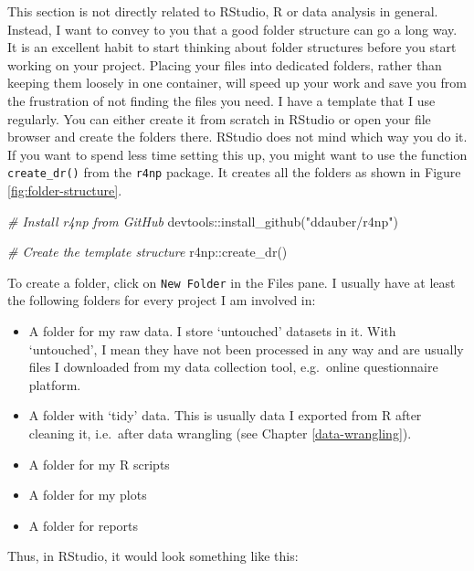 \documentclass[
]{book}
\newenvironment{Shaded}{\begin{snugshade}}{\end{snugshade}}
\newcommand{\CommentTok}[1]{\textcolor[rgb]{0.56,0.35,0.01}{\textit{#1}}}
\newcommand{\FunctionTok}[1]{\textcolor[rgb]{0.00,0.00,0.00}{#1}}
\newcommand{\NormalTok}[1]{#1}
\newcommand{\SpecialCharTok}[1]{\textcolor[rgb]{0.00,0.00,0.00}{#1}}
\newcommand{\StringTok}[1]{\textcolor[rgb]{0.31,0.60,0.02}{#1}}
\begin{document}
This section is not directly related to RStudio, R or data analysis in general. Instead, I want to convey to you that a good folder structure can go a long way. It is an excellent habit to start thinking about folder structures before you start working on your project. Placing your files into dedicated folders, rather than keeping them loosely in one container, will speed up your work and save you from the frustration of not finding the files you need. I have a template that I use regularly. You can either create it from scratch in RStudio or open your file browser and create the folders there. RStudio does not mind which way you do it. If you want to spend less time setting this up, you might want to use the function \texttt{create\_dr()} from the \texttt{r4np} package. It creates all the folders as shown in Figure \ref{fig:folder-structure}.

\begin{Shaded}
\begin{Highlighting}[]
\CommentTok{\# Install \textquotesingle{}r4np\textquotesingle{} from GitHub}
\NormalTok{devtools}\SpecialCharTok{::}\FunctionTok{install\_github}\NormalTok{(}\StringTok{"ddauber/r4np"}\NormalTok{)}

\CommentTok{\# Create the template structure}
\NormalTok{r4np}\SpecialCharTok{::}\FunctionTok{create\_dr}\NormalTok{()}
\end{Highlighting}
\end{Shaded}

To create a folder, click on \texttt{New\ Folder} in the Files pane. I usually have at least the following folders for every project I am involved in:

\begin{itemize}
\item
  A folder for my raw data. I store `untouched' datasets in it. With `untouched', I mean they have not been processed in any way and are usually files I downloaded from my data collection tool, e.g.~online questionnaire platform.
\item
  A folder with `tidy' data. This is usually data I exported from R after cleaning it, i.e.~after data wrangling (see Chapter \ref{data-wrangling}).
\item
  A folder for my R scripts
\item
  A folder for my plots
\item
  A folder for reports
\end{itemize}

Thus, in RStudio, it would look something like this:
\end{document}
